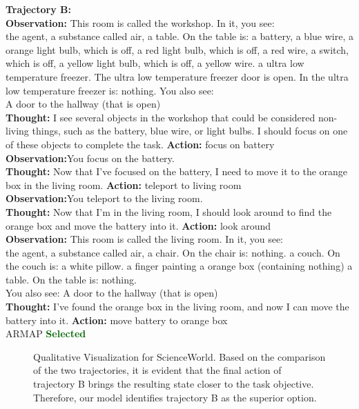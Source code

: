 \begin{tcolorbox}[breakable,title=Qualitative Visualization for ScienceWorld]
\textcolor{my_green!50}{\textbf{Trajectory B:} }\\
\textcolor{my_blue!50}{\textbf{Observation:} This room is called the workshop. In it, you see: \\the agent, a substance called air, a table. On the table is: a battery, a blue wire, a orange light bulb, which is off, a red light bulb, which is off, a red wire, a switch, which is off, a yellow light bulb, which is off, a yellow wire. a ultra low temperature freezer. The ultra low temperature freezer door is open. In the ultra low temperature freezer is: nothing. You also see:\\A door to the hallway (that is open) }\\
\textcolor{my_purple}{\textbf{Thought: }I see several objects in the workshop that could be considered non-living things, such as the battery, blue wire, or light bulbs. I should focus on one of these objects to complete the task.  \textbf{Action:} focus on battery}\\
\textcolor{my_blue!50}{\textbf{Observation:}You focus on the battery.}\\
\textcolor{my_purple}{\textbf{Thought:} Now that I've focused on the battery, I need to move it to the orange box in the living room. \textbf{Action:} teleport to living room}\\
\textcolor{my_blue!50}{\textbf{Observation:}You teleport to the living room.}\\
\textcolor{my_purple}{\textbf{Thought:} Now that I'm in the living room, I should look around to find the orange box and move the battery into it.  \textbf{Action:} look around}\\
\textcolor{my_blue!50}{\textbf{Observation:} This room is called the living room. In it, you see:\\ the agent, a substance called air, a chair. On the chair is: nothing. a couch. On the couch is: a white pillow. a finger painting a orange box (containing nothing) a table. On the table is: nothing. \\You also see: A door to the hallway (that is open) }\\
\textcolor{my_purple}{\textbf{Thought:} I've found the orange box in the living room, and now I can move the battery into it. \textbf{Action:} move battery to orange box}\\
ARMAP \textcolor{darkgreen}{\textbf{Selected}}\\
\end{tcolorbox}
\begin{figure}[!htp]
    \centering
    \vspace{-8pt}
    \caption{
    Qualitative Visualization for ScienceWorld. Based on the comparison of the two trajectories, it is evident that the final action of trajectory B brings the resulting state closer to the task objective. Therefore, our model identifies trajectory B as the superior option.
    }
    \label{fig:qualitative_vis_sci}
\end{figure}



